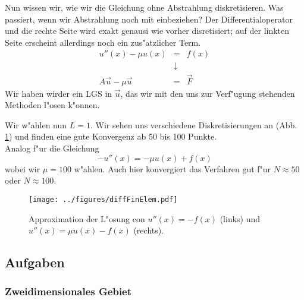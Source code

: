 Nun wissen wir, wie wir die Gleichung ohne Abstrahlung diskretisieren. 
Was passiert, wenn wir Abstrahlung noch mit einbeziehen? Der Differentialoperator und die rechte Seite wird exakt genausi wie vorher disretisiert; auf der linkten Seite erscheint allerdings noch ein zus"atzlicher Term.
\begin{eqnarray*}
u''(x) - \mu u(x) &=& f(x)\\
      &\downarrow&\\
 A \vec u - \mu\vec u &=& \vec F
\end{eqnarray*}
Wir haben wirder ein LGS in $\vec u$, das wir mit den uns zur Verf"ugung stehenden Methoden l"osen k"onnen.

\begin{bspX}
Wir w"ahlen nun $L=1$. 
Wir sehen uns verschiedene Diskretisierungen an (Abb.~ \ref{numPDEFinDiffExpl}) und finden
eine gute Konvergenz ab 50 bis 100 Punkte.\\
Analog f"ur die Gleichung 
$$ - u''(x) = -\mu u(x) +f(x)$$
wobei wir $\mu =100$ w"ahlen. Auch hier konvergiert das Verfahren
gut f"ur $N\approx 50$ oder $N\approx 100$.
\end{bspX}


\begin{figure}[htbp]
 \centering
   \texttt{[image: ../figures/diffFinElem.pdf]}
   \caption{Approximation der L"osung con $u''(x) = -f(x)$ (links)
   und $u''(x) = \mu u(x)-f(x)$ (rechts).}
   \label{numPDEFinDiffExpl}
\end{figure}


\subsection*{Aufgaben}
\begin{auf}\chb\label{bloc11XA1}

\end{auf}

\begin{auf}\chc\label{bloc11XA2}

\end{auf}



\subsubsection{Zweidimensionales Gebiet}


